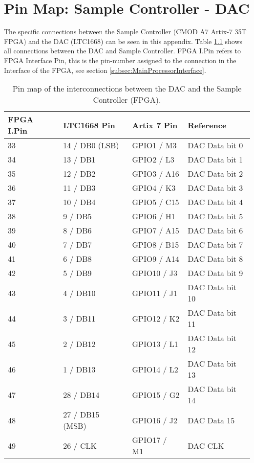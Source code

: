 \chapter{Pin Map: Sample Controller - DAC} \label{App:PinMap_FPGA_DAC}
The specific connections between the Sample Controller (CMOD A7 Artix-7 35T FPGA) and the DAC (LTC1668) can be seen in this appendix. Table \ref{tab:App_FPGA_DAC_PinMap} shows all connections between the DAC and Sample Controller. FPGA I.Pin refers to FPGA Interface Pin, this is the
pin-number assigned to the connection in the Interface of the FPGA, see section \ref{subsec:MainProcessorInterface}. 

\begin{table}[H]
    \begin{tabular}{|m{5.2em}|m{8em}|m{8em}|m{8em}|}
    \hline
    \textbf{FPGA I.Pin} &   \textbf{LTC1668 Pin} & \textbf{Artix 7 Pin} & \textbf{Reference}  \\ \hline
    33 & 14 / DB0 (LSB) & GPIO1 / M3 & DAC Data bit 0 \\ \hline
    34 & 13 / DB1 & GPIO2 / L3 & DAC Data bit 1 \\ \hline
    35 & 12 / DB2 & GPIO3 / A16 & DAC Data bit 2 \\ \hline
    36 & 11 / DB3 & GPIO4 / K3 & DAC Data bit 3 \\\hline
    37 & 10 / DB4 & GPIO5 / C15 & DAC Data bit 4 \\ \hline
    38 & 9 / DB5 & GPIO6 / H1 & DAC Data bit 5 \\ \hline
    39 & 8 / DB6 & GPIO7 / A15 & DAC Data bit 6 \\ \hline
    40 & 7 / DB7 & GPIO8 / B15 & DAC Data bit 7 \\ \hline
    41 & 6 / DB8 & GPIO9 / A14 & DAC Data bit 8 \\ \hline
    42 & 5 / DB9 & GPIO10 / J3 & DAC Data bit 9 \\ \hline
    43 & 4 / DB10 & GPIO11 / J1 & DAC Data bit 10 \\ \hline
    44 & 3 / DB11 & GPIO12 / K2 & DAC Data bit 11 \\ \hline
    45 & 2 / DB12 & GPIO13 / L1 & DAC Data bit 12 \\ \hline
    46 & 1 / DB13 & GPIO14 / L2 & DAC Data bit 13 \\ \hline
    47 & 28 / DB14 & GPIO15 / G2 & DAC Data bit 14 \\ \hline
    48 & 27 / DB15 (MSB) & GPIO16 / J2 & DAC Data 15 \\ \hline
    49 & 26 / CLK & GPIO17 / M1 & DAC CLK \\ \hline
 
    \end{tabular}
    \caption{Pin map of the interconnections between the DAC and the Sample Controller (FPGA).}
    \label{tab:App_FPGA_DAC_PinMap}
  \end{table}
